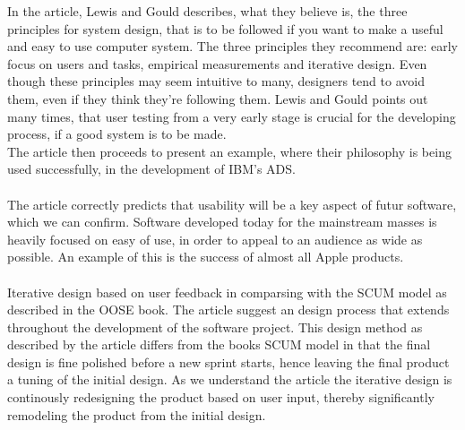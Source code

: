 \documentclass[12pt]{article}
\begin{document}
In the article, Lewis and Gould describes, what they believe is, the three principles for system design, that is to be followed if you want to make a useful and easy to use computer system. The three principles they recommend are: early focus on users and tasks, empirical measurements and iterative design. Even though these principles may seem intuitive to many, designers tend to avoid them, even if they think they're following them. Lewis and Gould points out many times, that user testing from a very early stage is crucial for the developing process, if a good system is to be made.\\
The article then proceeds to present an example, where their philosophy is being used successfully, in the development of IBM's ADS.\\ \\
The article correctly predicts that usability will be a key aspect of futur software, which we can confirm. Software developed today for the mainstream masses is heavily focused on easy of use, in order to appeal to an audience as wide as possible. An example of this is the success of almost all Apple products.\\ \\ 
Iterative design based on user feedback in comparsing with the SCUM model as described in the OOSE book. The article suggest an design process that extends throughout the development of the software project. This design method as described by the article differs from the books SCUM model in that the final design is fine polished before a new sprint starts, hence leaving the final product a tuning of the initial design. As we understand the article the iterative design is continously redesigning the product based on user input, thereby significantly remodeling the product from the initial design.
\end{document}
